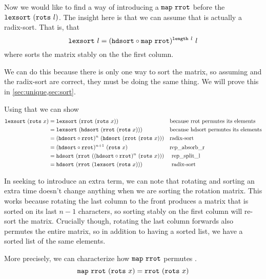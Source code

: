 \documentclass[11pt]{thesis}
\begin{document}
Now we would like to find a way of introducing a $\texttt{map}~\texttt{rrot}$
before the $\texttt{lexsort}~(\texttt{rots}~l)$. The insight here is that we can
assume that  is actually a radix-sort. That is, that
\begin{equation*}
\texttt{lexsort}~l = (\texttt{hdsort} \circ \texttt{map}~\texttt{rrot})^{\texttt{length}~l}~l
\end{equation*}
where  sorts the matrix stably on the the first column.

We can do this because there is only one way to sort the matrix, so
assuming  and the radix-sort are correct, they must be
doing the same thing. We will prove this in
\cref{sec:unique,sec:sort}.

Using that we can show
\begin{align*}
     \texttt{lexsort}~(\texttt{rots}~x)
  &= \texttt{lexsort}~(\texttt{rrot}~(\texttt{rots}~x))
     && \text{because rrot permutes its elements} \\
  &= \texttt{lexsort}~(\texttt{hdsort}~(\texttt{rrot}~(\texttt{rots}~x)))
     && \text{because hdsort permutes its elements} \\
  &= (\texttt{hdsort} \circ \texttt{rrot})^n~(\texttt{hdsort}~(\texttt{rrot}~(\texttt{rots}~x)))
     && \text{radix-sort} \\
  &= (\texttt{hdsort} \circ \texttt{rrot})^{n+1}~(\texttt{rots}~x)
  && \text{rep\_absorb\_r} \\
  &= \texttt{hdsort}~(\texttt{rrot}~((\texttt{hdsort} \circ \texttt{rrot})^n~(\texttt{rots}~x)))
     && \text{ rep\_split\_l } \\
  &= \texttt{hdsort}~(\texttt{rrot}~(\texttt{lexsort}~(\texttt{rots}~x)))
     && \text{ radix-sort }
\end{align*}

In seeking to introduce an extra  term, we can note that
rotating and sorting an extra time doesn't change anything when we are
sorting the rotation matrix. This works because rotating the last
column to the front produces a matrix that is sorted on its last $n -
1$ characters, so sorting stably on the first column will re-sort the
matrix. Crucially though, rotating the last column forwards also
permutes the entire matrix, so in addition to having a sorted list, we
have a sorted list of the same elements.

More precisely, we can characterize how $\texttt{map}~\texttt{rrot}$
permutes .
\begin{equation*}
  \texttt{map}~\texttt{rrot}~(\texttt{rots}~x) = \texttt{rrot}~(\texttt{rots}~x)
\end{equation*}
\end{document}
